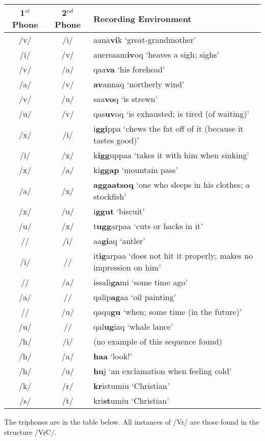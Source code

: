 \documentclass[12pt]{article}
\begin{document}
	\begin{tabular}{|c|c|l|}
	\hline
	1$^{st}$ Phone & 2$^{nd}$ Phone & Recording Environment \\
	\hline
	/v/ & /i/ & aana\textbf{vi}k `great-grandmother'\\
	/i/ & /v/ & anersaam\textbf{iv}oq `heaves a sigh; sighs'\\
	/v/ & /a/ & qaa\textbf{va} `his forehead'\\
	/a/ & /v/ & \textbf{av}annaq `northerly wind' \\
	/v/ & /u/ & saa\textbf{vo}q `is strewn'\\
	/u/ & /v/ & qas\textbf{uv}oq `is exhausted; is tired (of waiting)'\\
	/x/ & /i/ & i\textbf{ggi}ppa `chews the fat off of it (because it tastes good)'\\
	/i/ & /x/ & k\textbf{igg}uppaa `takes it with him when sinking'\\
	/x/ & /a/ & ki\textbf{ggap} `mountain pass'\\
	/a/ & /x/ & \textbf{aggaatsoq} `one who sleeps in his clothes; a stockfish'\\
	/x/ & /u/ & i\textbf{ggut} `biscuit'\\
	/u/ & /x/ & t\textbf{ugg}arpaa `cuts or hacks in it'\\
	/\textipa{X}/ & /i/ & aa\textbf{gi}aq `antler'\\
	/i/ & /\textipa{X}/ & it\textbf{ig}arpaa `does not hit it properly; makes no impression on him'\\
	/\textipa{X}/ & /a/ & issali\textbf{ga}mi `some time ago'\\
	/a/ & /\textipa{X}/ & qalip\textbf{ag}aa `oil painting'\\
	/\textipa{X}/ & /u/ & qaqu\textbf{gu} `when; some time (in the future)'\\
	/u/ & /\textipa{X}/ & qal\textbf{ug}iaq `whale lance'\\
	/h/ & /i/ & (no example of this sequence found) \\ %
	/h/ & /a/ & \textbf{haa} `look!' \\
	/h/ & /u/ & \textbf{hu}j `an exclamation when feeling cold' \\
	/k/ & /r/ & \textbf{kr}istumiu `Christian'\\
	/s/ & /t/ & kri\textbf{st}umiu `Christian'\\
	\hline
	\end{tabular}
	\newpage
	The triphones are in the table below. All instances of /Vr/ are those found in the structure /VrC/.
\end{document}
